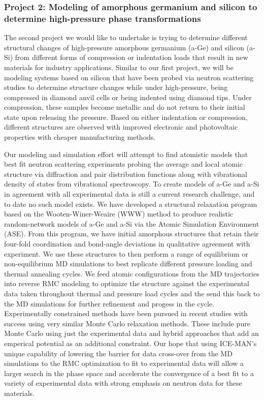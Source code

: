\subsubsection*{Project 2: Modeling of amorphous germanium and silicon to determine high-pressure phase transformations}\label{haberl}

The second project we would like to undertake is trying to determine different structural changes of high-pressure amorphous germanium (a-Ge) and silicon (a-Si) from different forms of compression or indentation loads that result in new materials for industry applications. Similar to our first project, we will be modeling systems based on silicon that have been probed via neutron scattering studies to determine structure changes while under high-pressure, being compressed in diamond anvil cells or being indented using diamond tips. Under compression, these samples become metallic and do not return to their initial state upon releasing the pressure. Based on either indentation or compression, different structures are observed with improved electronic and photovoltaic properties with cheaper manufacturing methods. 

Our modeling and simulation effort will attempt to find atomistic models that best fit neutron scattering experiments probing the average and local atomic structure via diffraction and pair distribution functions along with vibrational density of states from vibrational spectroscopy. To create models of a-Ge and a-Si in agreement with all experimental data is still a current research challenge, and to date no such model exists. We have developed a structural relaxation program based on the Wooten-Winer-Weaire (WWW) method to produce realistic random-network models of a-Ge and a-Si via the Atomic Simulation Environment (ASE). From this program, we have initial amorphous structures that retain their four-fold coordination and bond-angle deviations in qualitative agreement with experiment. We use these structures to then perform a range of equilibrium or non-equilibrium MD simulations to best replicate different pressure loading and thermal annealing cycles. We feed atomic configurations from the MD trajectories into reverse RMC modeling to optimize the structure against the experimental data taken throughout thermal and pressure load cycles and the send this back to the MD simulations for further refinement and progess in the cycle. Experimentally constrained methods have been pursued in recent studies with success using very similar Monte Carlo relaxation methods. These include pure Monte Carlo using just the experimental data and hybrid approaches that add an emperical potential as an additional constraint. Our hope that using ICE-MAN's unique capability of lowering the barrier for data cross-over from the MD simulations to the RMC optimization to fit to experimental data will allow a larger search in the phase space and accelerate the convergence of a best fit to a variety of experimental data with strong emphasis on neutron data for these materials.